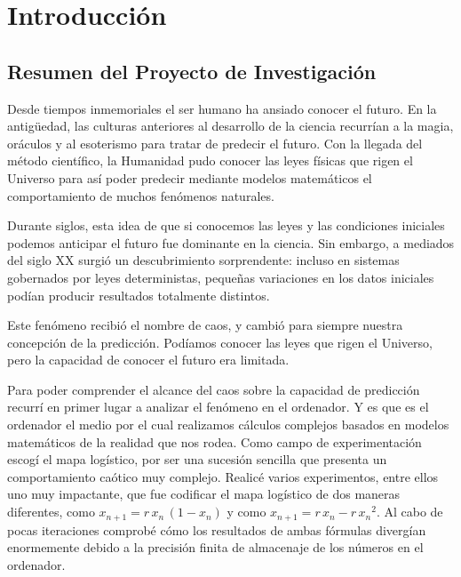 \documentclass[
  10pt,
  a4paper,
  DIV=11,
  numbers=noendperiod,
  open=any]{scrreprt}
\numberwithin{equation}{chapter}
\renewcommand{\contentsname}{Tabla de contenidos}
\numberwithin{equation}{section}
\renewcommand{\[}{\begin{equation}}
\renewcommand{\]}{\end{equation}}
\begin{document}
\renewcommand*\contentsname{Índice}
{
\setcounter{tocdepth}{0}
\tableofcontents
}


\part{Introducción}

\chapter{Resumen del Proyecto de
Investigación}\label{resumen-del-proyecto-de-investigaciuxf3n}

Desde tiempos inmemoriales el ser humano ha ansiado conocer el futuro.
En la antigüedad, las culturas anteriores al desarrollo de la ciencia
recurrían a la magia, oráculos y al esoterismo para tratar de predecir
el futuro. Con la llegada del método científico, la Humanidad pudo
conocer las leyes físicas que rigen el Universo para así poder predecir mediante modelos matemáticos el comportamiento de muchos fenómenos naturales. 

Durante siglos, esta idea de que si conocemos las leyes y las
condiciones iniciales podemos anticipar el futuro fue dominante en la
ciencia. Sin embargo, a mediados del siglo XX surgió un descubrimiento
sorprendente: incluso en sistemas gobernados por leyes deterministas,
pequeñas variaciones en los datos iniciales podían producir resultados
totalmente distintos.

Este fenómeno recibió el nombre de caos, y cambió para siempre nuestra
concepción de la predicción. Podíamos conocer las leyes que rigen el
Universo, pero la capacidad de conocer el futuro era limitada.

Para poder comprender el alcance del caos sobre la capacidad de
predicción recurrí en primer lugar a analizar el fenómeno en el
ordenador. Y es que es el ordenador el medio por el cual realizamos
cálculos complejos basados en modelos matemáticos de la realidad que nos
rodea. Como campo de experimentación escogí el mapa logístico, por ser
una sucesión sencilla que presenta un comportamiento caótico muy
complejo. Realicé varios experimentos, entre ellos uno muy impactante,
que fue codificar el mapa logístico de dos maneras diferentes, como
\(x_{n+1} = r\,x_n\,(1 - x_n)\) y como
\(x_{n+1} = r\,x_n - r\,{x_n}^2\). Al cabo de pocas iteraciones comprobé
cómo los resultados de ambas fórmulas divergían enormemente debido a la
precisión finita de almacenaje de los números en el ordenador.
\end{document}

